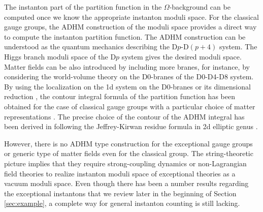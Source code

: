 \documentclass[letterpaper, 11pt]{article}
\begin{document}
The instanton part of the partition function in the $\Omega$-background can be computed once we know the appropriate instanton moduli space. For the classical gauge groups, the ADHM construction of the moduli space \cite{Atiyah:1978ri} provides a direct way to compute the instanton partition function. The ADHM construction can be understood as the quantum mechanics describing the D$p$-D$(p+4)$ system. The Higgs branch moduli space of the D$p$ system gives the desired moduli space. Matter fields can be also introduced by including more branes, for instance,
by considering the world-volume theory on the D0-branes of the D0-D4-D8 system. 
By using the localization on the 1d system on the D0-branes or its dimensional reduction \cite{Moore:1997dj, Bruzzo:2002xf}, the contour integral formula of the partition function has been obtained for the case of classical gauge groups with a particular choice of matter representations \cite{Nekrasov:2004vw, Marino:2004cn, Fucito:2004gi, Hollands:2010xa, Hollands:2011zc}. 
The precise choice of the contour of the ADHM integral has been derived in \cite{Hwang:2014uwa, Cordova:2014oxa,Hori:2014tda} following the Jeffrey-Kirwan residue formula in 2d elliptic genus \cite{Benini:2013xpa,Benini:2013nda}. 

However, there is no ADHM type construction for the exceptional gauge groups or generic type of matter fields even for the classical group. The string-theoretic picture implies that they require strong-coupling dynamics or non-Lagrangian field theories to realize instanton moduli space of exceptional theories as a vacuum moduli space. Even though there has been a number results regarding the exceptional instantons that we review later in the beginning of Section \ref{sec:example}, a complete way for general instanton counting is still lacking. 
\end{document}
